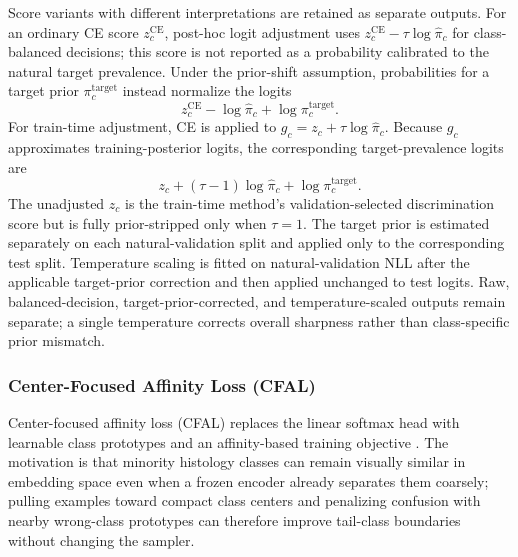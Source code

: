 \documentclass[11pt]{article}
\begin{document}
Score variants with different interpretations are retained as separate outputs. For an ordinary CE score $z_c^{\mathrm{CE}}$, post-hoc logit adjustment uses $z_c^{\mathrm{CE}}-\tau\log\widehat\pi_c$ for class-balanced decisions; this score is not reported as a probability calibrated to the natural target prevalence. Under the prior-shift assumption, probabilities for a target prior $\pi_c^{\mathrm{target}}$ instead normalize the logits
\begin{equation}
  z_c^{\mathrm{CE}}-\log\widehat\pi_c+\log\pi_c^{\mathrm{target}}.
  \label{eq:posthoc-target-prior}
\end{equation}
\noindent For train-time adjustment, CE is applied to $g_c=z_c+\tau\log\widehat\pi_c$. Because $g_c$ approximates training-posterior logits, the corresponding target-prevalence logits are
\begin{equation}
  z_c+(\tau-1)\log\widehat\pi_c+\log\pi_c^{\mathrm{target}}.
  \label{eq:train-time-target-prior}
\end{equation}
\noindent The unadjusted $z_c$ is the train-time method's validation-selected discrimination score but is fully prior-stripped only when $\tau=1$. The target prior is estimated separately on each natural-validation split and applied only to the corresponding test split. Temperature scaling is fitted on natural-validation NLL after the applicable target-prior correction and then applied unchanged to test logits. Raw, balanced-decision, target-prior-corrected, and temperature-scaled outputs remain separate; a single temperature corrects overall sharpness rather than class-specific prior mismatch.

\subsubsection{Center-Focused Affinity Loss (CFAL)}
Center-focused affinity loss (CFAL) replaces the linear softmax head with learnable class prototypes and an affinity-based training objective \citep{mahbub2024centerFocused}. The motivation is that minority histology classes can remain visually similar in embedding space even when a frozen encoder already separates them coarsely; pulling examples toward compact class centers and penalizing confusion with nearby wrong-class prototypes can therefore improve tail-class boundaries without changing the sampler.
\end{document}
